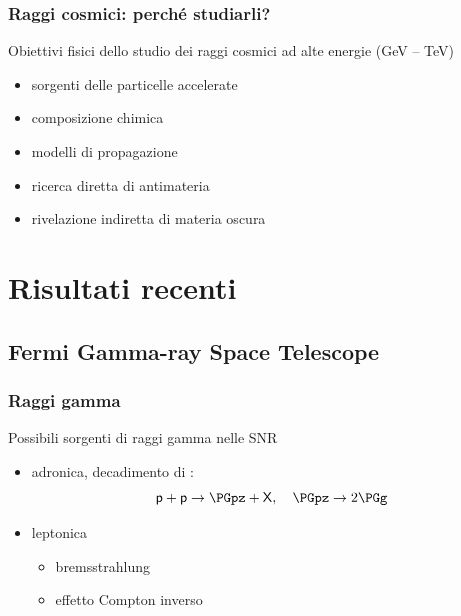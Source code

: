 \documentclass[10pt]{beamer}
\begin{document}
\begin{frame}
  \frametitle{Raggi cosmici: perché studiarli?}
  Obiettivi fisici dello studio dei raggi cosmici ad alte energie
  (\si{\giga\electronvolt} -- \si{\tera\electronvolt})
  \begin{itemize}
  \item sorgenti delle particelle accelerate
  \item composizione chimica
  \item modelli di propagazione
  \item ricerca diretta di antimateria
  \item rivelazione indiretta di materia oscura
  \end{itemize}
\end{frame}

\section{Risultati recenti}

\subsection{Fermi Gamma-ray Space Telescope}

\begin{frame}
  \frametitle{Raggi gamma}
  Possibili sorgenti di raggi gamma nelle SNR
  \begin{itemize}
  \item<+-> adronica, decadimento di \PGpz:
    \begin{equation*}
      \mathsf{p} + \mathsf{p} \to \PGpz + \mathsf{X}, \quad \PGpz \to 2\PGg
    \end{equation*}
  \item<+-> leptonica
    \begin{itemize}
    \item bremsstrahlung
    \item effetto Compton inverso
    \end{itemize}
  \end{itemize}
\end{frame}
\end{document}
